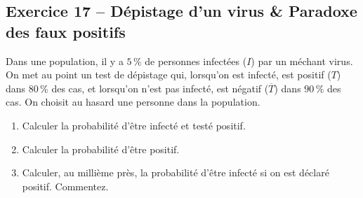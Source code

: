 \documentclass[11pt,a4paper]{article}
\begin{document}
\vspace{0.3cm}

\subsection*{Exercice 17 -- Dépistage d'un virus \& Paradoxe des faux positifs}

Dans une population, il y a $5\,\%$ de personnes infectées ($I$) par un méchant virus. On met au point un test de dépistage qui, lorsqu'on est infecté, est positif ($T$) dans $80\,\%$ des cas, et lorsqu'on n'est pas infecté, est négatif ($\overline{T}$) dans $90\,\%$ des cas. On choisit au hasard une personne dans la population.
\begin{enumerate}[label=\arabic*.]
    \item Calculer la probabilité d'être infecté et testé positif.
    \item Calculer la probabilité d'être positif.
    \item Calculer, au millième près, la probabilité d'être infecté si on est déclaré positif. Commentez.
\end{enumerate}
\end{document}
